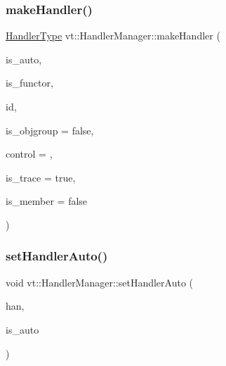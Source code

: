 \subsubsection{\texorpdfstring{make\+Handler()}{makeHandler()}}
{\footnotesize\ttfamily \hyperlink{namespacevt_af64846b57dfcaf104da3ef6967917573}{Handler\+Type} vt\+::\+Handler\+Manager\+::make\+Handler (\begin{DoxyParamCaption}\item[{bool}]{is\+\_\+auto,  }\item[{bool}]{is\+\_\+functor,  }\item[{\hyperlink{namespacevt_a59ae068fe828d1c33051ff96f3d016b6}{Handler\+Identifier\+Type}}]{id,  }\item[{bool}]{is\+\_\+objgroup = {\ttfamily false},  }\item[{\hyperlink{namespacevt_adbbef13b92f0a93b14c219b7cc8a48f2}{Handler\+Control\+Type}}]{control = {},  }\item[{bool}]{is\+\_\+trace = {\ttfamily true},  }\item[{bool}]{is\+\_\+member = {\ttfamily false} }\end{DoxyParamCaption})\hspace{0.3cm}{\ttfamily [static]}}

\mbox{\label{structvt_1_1_handler_manager_a9100f9e0e946b58d98d104a5cbcf5574}} 
\subsubsection{\texorpdfstring{set\+Handler\+Auto()}{setHandlerAuto()}}
{\footnotesize\ttfamily void vt\+::\+Handler\+Manager\+::set\+Handler\+Auto (\begin{DoxyParamCaption}\item[{\hyperlink{namespacevt_af64846b57dfcaf104da3ef6967917573}{Handler\+Type} \&}]{han,  }\item[{bool}]{is\+\_\+auto }\end{DoxyParamCaption})\hspace{0.3cm}{\ttfamily [static]}}

\mbox{\label{structvt_1_1_handler_manager_a8cfa04599d2bd111f1197b7bf2343a05}} 

